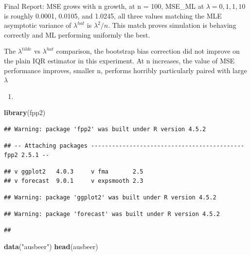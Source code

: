 \documentclass[
]{article}
\newenvironment{Shaded}{\begin{snugshade}}{\end{snugshade}}
\newcommand{\FunctionTok}[1]{\textcolor[rgb]{0.13,0.29,0.53}{\textbf{#1}}}
\newcommand{\NormalTok}[1]{#1}
\newcommand{\StringTok}[1]{\textcolor[rgb]{0.31,0.60,0.02}{#1}}
\providecommand{\tightlist}{%
  \setlength{\itemsep}{0pt}\setlength{\parskip}{0pt}}
\begin{document}
Final Report: MSE grows with n growth, at n = 100, MSE\_ML at
\(\lambda = 0,1, 1, 10\) is roughly 0.0001, 0.0105, and 1.0245, all
three values matching the MLE asymptotic variance of \(\lambda^{hat}\)
is \(\lambda^2 / n\). This match proves simulation is behaving correctly
and ML performing uniformly the best.

The \(\lambda^{tilde}\) vs \(\lambda^{hat}\) comparison, the bootstrap
bias correction did not improve on the plain IQR estimator in this
experiment. At n increases, the value of MSE performance improves,
smaller n, performs horribly particularly paired with large \(\lambda\)

\begin{enumerate}
\def\labelenumi{\arabic{enumi}.}
\setcounter{enumi}{1}
\tightlist
\item
\end{enumerate}

\begin{Shaded}
\begin{Highlighting}[]
\FunctionTok{library}\NormalTok{(fpp2)}
\end{Highlighting}
\end{Shaded}

\begin{verbatim}
## Warning: package 'fpp2' was built under R version 4.5.2
\end{verbatim}

\begin{verbatim}
## -- Attaching packages -------------------------------------------- fpp2 2.5.1 --
\end{verbatim}

\begin{verbatim}
## v ggplot2   4.0.3     v fma       2.5  
## v forecast  9.0.1     v expsmooth 2.3
\end{verbatim}

\begin{verbatim}
## Warning: package 'ggplot2' was built under R version 4.5.2
\end{verbatim}

\begin{verbatim}
## Warning: package 'forecast' was built under R version 4.5.2
\end{verbatim}

\begin{verbatim}
## 
\end{verbatim}

\begin{Shaded}
\begin{Highlighting}[]
\FunctionTok{data}\NormalTok{(}\StringTok{"ausbeer"}\NormalTok{)}
\FunctionTok{head}\NormalTok{(ausbeer)}
\end{Highlighting}
\end{Shaded}
\end{document}
